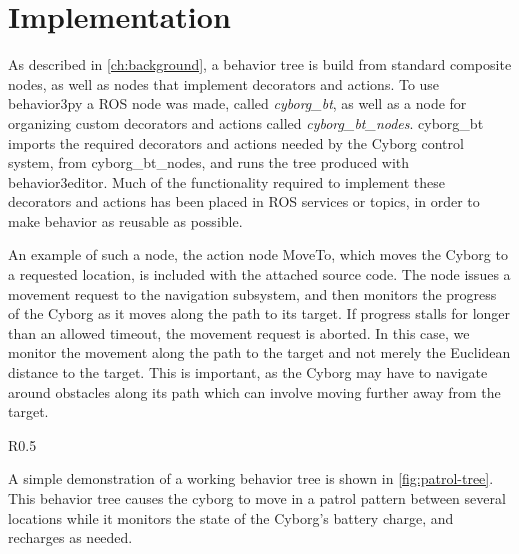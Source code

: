 \documentclass[\rootfolder/main.tex]{subfiles}
\begin{document}

\section{Implementation}

As described in \cref{ch:background}, a behavior tree is build from standard composite nodes, as well as nodes that implement decorators and actions.
To use behavior3py a ROS node was made, called \emph{cyborg\_bt}, as well as a node for organizing custom decorators and actions called \emph{cyborg\_bt\_nodes}.
cyborg\_bt imports the required decorators and actions needed by the Cyborg control system, from cyborg\_bt\_nodes, and runs the tree produced with behavior3editor.
Much of the functionality required to implement these decorators and actions has been placed in ROS services or topics, in order to make behavior as reusable as possible.

An example of such a node, the action node MoveTo, which moves the Cyborg to a requested location, is included with the attached source code.
The node issues a movement request to the navigation subsystem, and then monitors the progress of the Cyborg as it moves along the path to its target.
If progress stalls for longer than an allowed timeout, the movement request is aborted.
In this case, we monitor the movement along the path to the target and not merely the Euclidean distance to the target.
This is important, as the Cyborg may have to navigate around obstacles along its path which can involve moving further away from the target.

\begin{wrapfigure}{R}{0.5\columnwidth}
    \caption{Behavior tree that checks battery state, and charges if necessary, while patrolling}
    \label{fig:patrol-tree}
\end{wrapfigure}

A simple demonstration of a working behavior tree is shown in \cref{fig:patrol-tree}.
This behavior tree causes the cyborg to move in a patrol pattern between several locations while it monitors the state of the Cyborg's battery charge, and recharges as needed.
\end{document}
